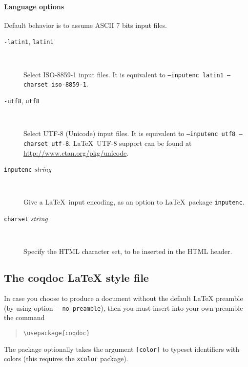 \paragraph{Language options}

Default behavior is to assume ASCII 7 bits input files.

\begin{description}

\item[\texttt{-latin1}, \texttt{\mm{}latin1}] ~\par

  Select ISO-8859-1 input files. It is equivalent to
  \texttt{--inputenc latin1 --charset iso-8859-1}.

\item[\texttt{-utf8}, \texttt{\mm{}utf8}] ~\par

  Select UTF-8 (Unicode) input files. It is equivalent to
  \texttt{--inputenc utf8 --charset utf-8}.
  \LaTeX\ UTF-8 support can be found at
 \url{http://www.ctan.org/pkg/unicode}.

\item[\texttt{\mm{}inputenc} \textit{string}] ~\par

  Give a \LaTeX\ input encoding, as an option to \LaTeX\ package
  \texttt{inputenc}. 

\item[\texttt{\mm{}charset} \textit{string}] ~\par

  Specify the HTML character set, to be inserted in the HTML header.

\end{description}



\subsection[The coqdoc \LaTeX{} style file]{The coqdoc \LaTeX{} style file\label{section:coqdoc.sty}}

In case you choose to produce a document without the default \LaTeX{}
preamble (by using option \verb|--no-preamble|), then you must insert
into your own preamble the command
\begin{quote}
  \verb|\usepackage{coqdoc}|
\end{quote}

The package optionally takes the argument \verb|[color]| to typeset
identifiers with colors (this requires the \verb|xcolor| package).

